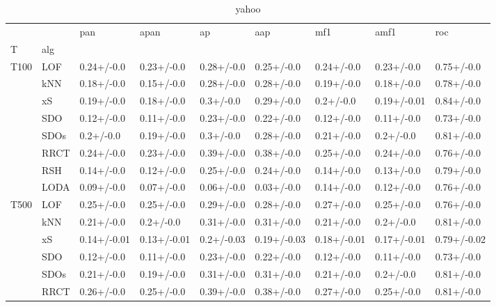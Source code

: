 \begin{table}
\centering
\caption{yahoo}
\begin{tabular}{lllllllll}
\toprule
      &      &          pan &         apan &           ap &          aap &          mf1 &         amf1 &          roc \\
T & alg &              &              &              &              &              &              &              \\
\midrule
T100 & LOF &   0.24+/-0.0 &   0.23+/-0.0 &   0.28+/-0.0 &   0.25+/-0.0 &   0.24+/-0.0 &   0.23+/-0.0 &   0.75+/-0.0 \\
      & kNN &   0.18+/-0.0 &   0.15+/-0.0 &   0.28+/-0.0 &   0.28+/-0.0 &   0.19+/-0.0 &   0.18+/-0.0 &   0.78+/-0.0 \\
      & xS &   0.19+/-0.0 &   0.18+/-0.0 &    0.3+/-0.0 &   0.29+/-0.0 &    0.2+/-0.0 &  0.19+/-0.01 &   0.84+/-0.0 \\
      & SDO &   0.12+/-0.0 &   0.11+/-0.0 &   0.23+/-0.0 &   0.22+/-0.0 &   0.12+/-0.0 &   0.11+/-0.0 &   0.73+/-0.0 \\
      & SDOs &    0.2+/-0.0 &   0.19+/-0.0 &    0.3+/-0.0 &   0.28+/-0.0 &   0.21+/-0.0 &    0.2+/-0.0 &   0.81+/-0.0 \\
      & RRCT &   0.24+/-0.0 &   0.23+/-0.0 &   0.39+/-0.0 &   0.38+/-0.0 &   0.25+/-0.0 &   0.24+/-0.0 &   0.76+/-0.0 \\
      & RSH &   0.14+/-0.0 &   0.12+/-0.0 &   0.25+/-0.0 &   0.24+/-0.0 &   0.14+/-0.0 &   0.13+/-0.0 &   0.79+/-0.0 \\
      & LODA &   0.09+/-0.0 &   0.07+/-0.0 &   0.06+/-0.0 &   0.03+/-0.0 &   0.14+/-0.0 &   0.12+/-0.0 &   0.76+/-0.0 \\
T500 & LOF &   0.25+/-0.0 &   0.25+/-0.0 &   0.29+/-0.0 &   0.28+/-0.0 &   0.27+/-0.0 &   0.25+/-0.0 &   0.76+/-0.0 \\
      & kNN &   0.21+/-0.0 &    0.2+/-0.0 &   0.31+/-0.0 &   0.31+/-0.0 &   0.21+/-0.0 &    0.2+/-0.0 &   0.81+/-0.0 \\
      & xS &  0.14+/-0.01 &  0.13+/-0.01 &   0.2+/-0.03 &  0.19+/-0.03 &  0.18+/-0.01 &  0.17+/-0.01 &  0.79+/-0.02 \\
      & SDO &   0.12+/-0.0 &   0.11+/-0.0 &   0.23+/-0.0 &   0.22+/-0.0 &   0.12+/-0.0 &   0.11+/-0.0 &   0.73+/-0.0 \\
      & SDOs &   0.21+/-0.0 &   0.19+/-0.0 &   0.31+/-0.0 &   0.31+/-0.0 &   0.21+/-0.0 &    0.2+/-0.0 &   0.81+/-0.0 \\
      & RRCT &   0.26+/-0.0 &   0.25+/-0.0 &   0.39+/-0.0 &   0.38+/-0.0 &   0.27+/-0.0 &   0.25+/-0.0 &   0.81+/-0.0 \\

\end{tabular}
\end{table}
